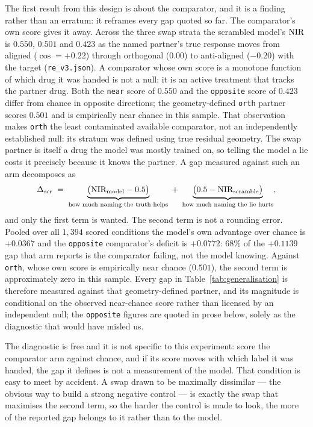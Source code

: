 The first result from this design is about the comparator, and it is a finding rather than an
erratum: it reframes every gap quoted so far. The comparator's own score gives it away. Across the
three swap strata the scrambled model's $\textrm{NIR}$ is $0.550$, $0.501$ and $0.423$ as the named
partner's true response moves from aligned ($\cos = +0.22$) through orthogonal ($0.00$) to
anti-aligned ($-0.20$) with the target (\texttt{re\_v3.json}). A comparator whose own score is a
monotone function of which drug it was handed is not a null: it is an active treatment that tracks
the partner drug. Both the \texttt{near} score of $0.550$ and the \texttt{opposite} score of $0.423$
differ from chance in opposite directions; the geometry-defined \texttt{orth} partner scores
$0.501$ and is empirically near chance in this sample. That observation makes \texttt{orth} the
least contaminated available comparator, not an independently established null: its stratum was
defined using true residual geometry. The swap partner is itself a drug the model was mostly trained on, so
telling the model a lie costs it precisely because it knows the partner. A gap measured against such
an arm decomposes as
\begin{equation}
 \Delta_{\textrm{scr}} \;=\; \underbrace{\big(\textrm{NIR}_{\textrm{model}} - 0.5\big)}_{\textrm{how much naming the truth helps}}
 \;+\; \underbrace{\big(0.5 - \textrm{NIR}_{\textrm{scramble}}\big)}_{\textrm{how much naming the lie hurts}},
\end{equation}
and only the first term is wanted. The second term is not a rounding error. Pooled over all
$1{,}394$ scored conditions the model's own advantage over chance is $+0.0367$ and the
\texttt{opposite} comparator's deficit is $+0.0772$: $68\%$ of the $+0.1139$ gap that arm reports is
the comparator failing, not the model knowing. Against \texttt{orth}, whose own score is empirically
near chance ($0.501$), the second term is approximately zero in this sample. Every gap in
Table~\ref{tab:generalisation} is therefore measured against that geometry-defined partner, and its
magnitude is conditional on the observed near-chance score rather than licensed by an independent null; the
\texttt{opposite} figures are quoted in prose below, solely as the diagnostic that would have misled
us.

The diagnostic is free and it is not specific to this experiment: score the comparator arm against
chance, and if its score moves with which label it was handed, the gap it defines is not a
measurement of the model. That condition is easy to meet by accident. A swap drawn to be maximally
dissimilar --- the obvious way to build a strong negative control --- is exactly the swap that
maximises the second term, so the harder the control is made to look, the more of the reported gap
belongs to it rather than to the model.

